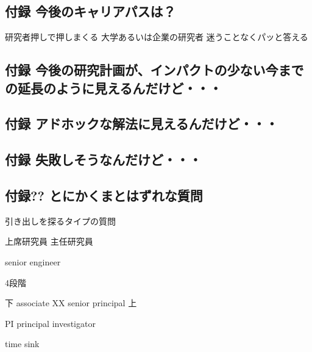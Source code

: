 \subsection{付録 今後のキャリアパスは？}
\label{sec-5-20}

研究者押しで押しまくる
大学あるいは企業の研究者
迷うことなくパッと答える

\subsection{付録 今後の研究計画が、インパクトの少ない今までの延長のように見えるんだけど・・・}
\label{sec-5-21}

\subsection{付録 アドホックな解法に見えるんだけど・・・}
\label{sec-5-22}

\subsection{付録 失敗しそうなんだけど・・・}
\label{sec-5-23}

\subsection{付録?? とにかくまとはずれな質問}
\label{sec-5-24}

引き出しを探るタイプの質問



上席研究員
主任研究員

senior engineer

4段階

下
associate
XX
senior
principal
上

PI principal investigator

time sink
